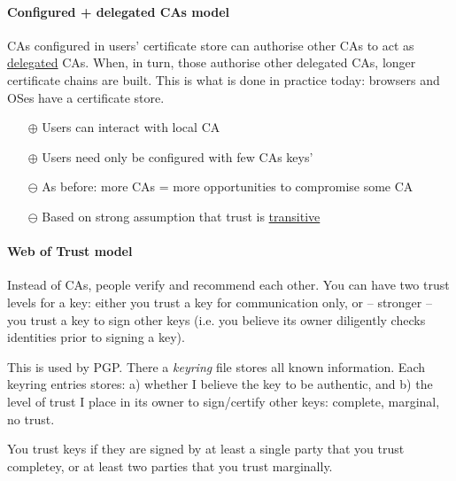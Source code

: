\paragraph{Configured + delegated CAs model} CAs configured in users' certificate store can authorise other CAs to act as \underline{delegated} CAs. When, in turn, those authorise other delegated CAs, longer certificate chains are built.
This is what is done in practice today: browsers and OSes have a certificate store.
\begin{itemize}
    \item[$\oplus$] Users can interact with local CA
    \item[$\oplus$] Users need only be configured with few CAs keys'
    \item[$\ominus$] As before: more CAs = more opportunities to compromise some CA
    \item[$\ominus$] Based on strong assumption that trust is \underline{transitive}
\end{itemize}


\paragraph{Web of Trust model} Instead of CAs, people verify and recommend each other. You can have two trust levels for a key: either you trust a key for communication only, or -- stronger -- you trust a key to sign other keys (i.e. you believe its owner diligently checks identities prior to signing a key).

This is used by PGP. There a \emph{keyring} file stores all known information. Each keyring entries stores: a) whether I believe the key to be authentic, and b) the level of trust I place in its owner to sign/certify other keys: complete, marginal, no trust.

You trust keys if they are signed by at least a single party that you trust completey, or at least two parties that you trust marginally.


